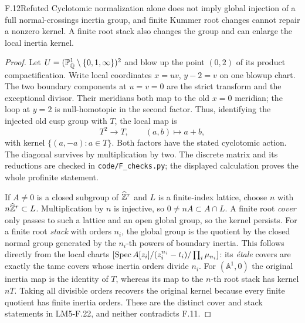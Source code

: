 \begin{claim}{F.12}{Refuted}
Cyclotomic normalization alone does not imply global injection of a
full normal-crossings inertia group, and finite Kummer root changes
cannot repair a nonzero kernel. A finite root stack also changes
the group and can enlarge the local inertia kernel.
\end{claim}
\begin{proof}
Let $U=(\mathbb P^1_{\mathbb Q}\setminus\{0,1,\infty\})^2$ and
blow up the point $(0,2)$ of its product compactification. Write
local coordinates $x=uv$, $y-2=v$ on one blowup chart. The two
boundary components at $u=v=0$ are the strict transform and the
exceptional divisor. Their meridians both map to the old $x=0$
meridian; the loop at $y=2$ is null-homotopic in the second factor.
Thus, identifying the injected old cusp group with $T$, the local
map is
\[
T^2\longrightarrow T,\qquad(a,b)\longmapsto a+b,
\]
with kernel $\{(a,-a):a\in T\}$. Both factors have the stated
cyclotomic action. The diagonal survives by multiplication by two.
The discrete matrix and its reductions are checked in
\texttt{code/F\_checks.py}; the displayed calculation proves the
whole profinite statement.

If $A\ne0$ is a closed subgroup of $\widehat{\mathbb Z}^r$ and $L$ is a
finite-index lattice, choose $n$ with $n\widehat{\mathbb Z}^r\subset L$.
Multiplication by $n$ is injective, so
$0\ne nA\subset A\cap L$. A finite root \emph{cover} only passes
to such a lattice and an open global group, so the kernel persists.
For a finite root \emph{stack} with orders $n_i$, the global group
is the quotient by the closed normal group generated by the
$n_i$-th powers of boundary inertia. This follows directly from
the local charts $[\operatorname{Spec} A[z_i]/(z_i^{n_i}-t_i)/\prod_i\mu_{n_i}]$:
its \emph{\'etale} covers are exactly the tame covers whose inertia
orders divide $n_i$. For $(\mathbb A^1,0)$ the original inertia
map is the identity of $T$, whereas its map to the $n$-th root
stack has kernel $nT$. Taking all divisible orders recovers the
original kernel because every finite quotient has finite inertia
orders. These are the distinct cover and stack statements in
LM5-F.22, and neither contradicts F.11.
\end{proof}

